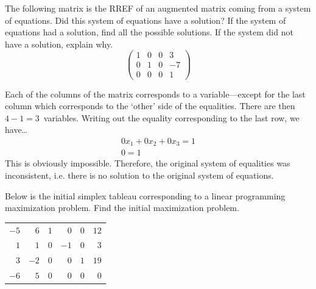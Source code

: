 \documentclass[12pt,letterpaper]{exam}
\begin{document}
\begin{questions}
\newpage
\question[10] The following matrix is the RREF of an augmented matrix coming from a system of equations. Did this system of equations have a solution? If the system of equations had a solution, find all the possible solutions. If the system did not have a solution, explain why. 
	\[
	\begin{pmatrix}
	1 & 0 & 0 & 3 \\
	0 & 1 & 0 & -7 \\
	0 & 0 & 0 & 1 
	\end{pmatrix}
	\] \pspace

\sol Each of the columns of the matrix corresponds to a variable---except for the last column which corresponds to the `other' side of the equalities. There are then $4 - 1= 3$~variables. Writing out the equality corresponding to the last row, we have\dots
	\[
	\begin{gathered}
	0x_1 + 0x_2 + 0x_3= 1 \\
	0= 1
	\end{gathered}
	\]
This is obviously impossible. Therefore, the original system of equalities was inconsistent, i.e. there is no solution to the original system of equations. 



\newpage
\question[10] Below is the initial simplex tableau corresponding to a linear programming maximization problem. Find the initial maximization problem. \par
	\begin{table}[H]
	\centering
	\begin{tabular}{rrrrrr}
	$-5$ & $6$ & $1$ & $0$ & $0$ & $12$ \\
	$1$ & $1$ & $0$ & $-1$ & $0$ & $3$ \\
	$3$ & $-2$ & $0$ & $0$ & $1$ & $19$ \\
	$-6$ & $5$ & $0$ & $0$ & $0$ & $0$ 
	\end{tabular}
	\end{table} \pspace


\end{questions}
\end{document}
